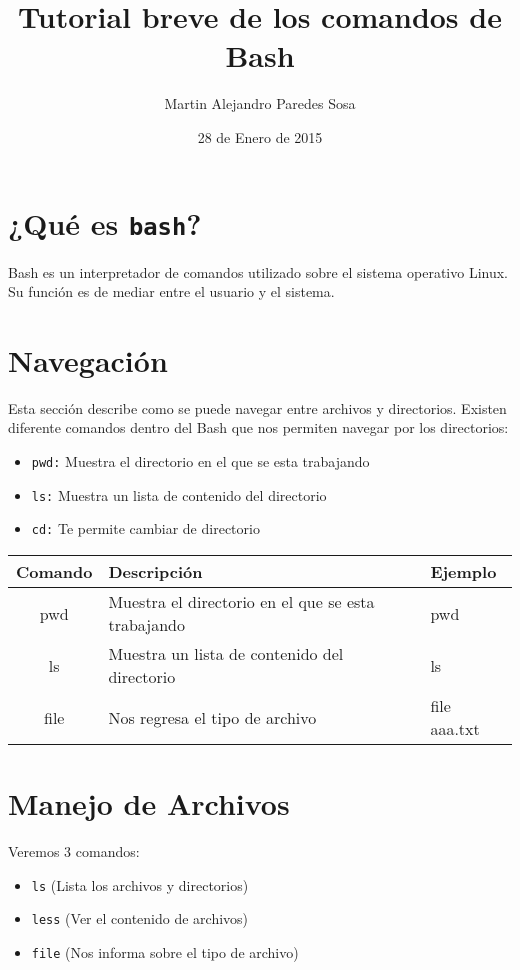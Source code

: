 \documentclass[12pt]{article}
\title{Tutorial breve de los comandos de Bash}
\author{Martin Alejandro Paredes Sosa}
\date{28 de Enero de 2015}
\begin{document}
\maketitle

\section{¿Qué es {\tt bash}?}

Bash es un interpretador de comandos utilizado sobre el sistema operativo Linux.
Su función es de mediar entre el usuario y el sistema.

\section{Navegación}

Esta sección describe como se puede navegar entre archivos y directorios.
Existen diferente comandos dentro del Bash que nos permiten navegar por los directorios:
\begin{itemize}
\item {\tt pwd:} Muestra el directorio en el que se esta trabajando
\item {\tt ls:} Muestra un lista de contenido del directorio
\item {\tt cd:} Te permite cambiar de directorio
\end{itemize}
\begin{tabular}{|c|l|l|}
\hline
Comando & Descripción & Ejemplo \\
\hline
pwd & Muestra el directorio en el que se esta trabajando & pwd \\ \hline
ls & Muestra un lista de contenido del directorio & ls\\ \hline
file & Nos regresa el tipo de archivo & file aaa.txt \\
\hline
\end{tabular} 

\section{Manejo de Archivos}

Veremos 3 comandos:

\begin{itemize}
\item {\tt ls} (Lista los archivos y directorios) 
\item {\tt less} (Ver el contenido de archivos)
\item {\tt file} (Nos informa sobre el tipo de archivo)
\end{itemize}
\end{document}
